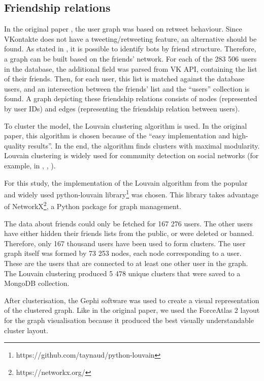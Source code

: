 \subsection{Friendship relations}
\label{sec:friendship-relations}
In the original paper \cite{Hagen2022}, the user graph was based on retweet behaviour. Since VKontakte does not have a tweeting/retweeting feature, an alternative should be found. As stated in \cite{Kolomeets2021}, it is possible to identify bots by friend structure. Therefore, a graph can be built based on the friends' network. For each of the 283 506 users in the database, the additional field was parsed from VK API, containing the list of their friends. Then, for each user, this list is matched against the database users, and an intersection between the friends' list and the ``users'' collection is found. A graph depicting these friendship relations consists of nodes (represented by user IDs) and edges (representing the friendship relation between users).

To cluster the model, the Louvain clustering algorithm is used\cite{louvainalg}. In the original paper\cite{Hagen2022}, this algorithm is chosen because of the ``easy implementation and high-quality results''.  In the end, the algorithm finds clusters with maximal modularity. Louvain clustering is widely used for community detection on social networks (for example, in \cite{louvaindynclust}, \cite{de2011generalized}, \cite{sanchez2016twitter}).

For this study, the implementation of the Louvain algorithm from the popular and widely used python-louvain library\footnote{https://github.com/taynaud/python-louvain} was chosen. This library takes advantage of NetworkX\footnote{https://networkx.org/}, a Python package for graph management.

The data about friends could only be fetched for 167 276 users. The other users have either hidden their friends lists from the public, or were deleted or banned. Therefore, only 167 thousand users have been used to form clusters. The user graph itself was formed by 73 253 nodes, each node corresponding to a user. These are the users that are connected to at least one other user in the graph. The Louvain clustering produced 5 478 unique clusters that were saved to a MongoDB collection.

After clusterisation, the Gephi software was used to create a visual representation of the clustered graph. Like in the original paper\cite{Hagen2022}, we used the ForceAtlas 2 layout for the graph visualisation because it produced the best visually understandable cluster layout.


